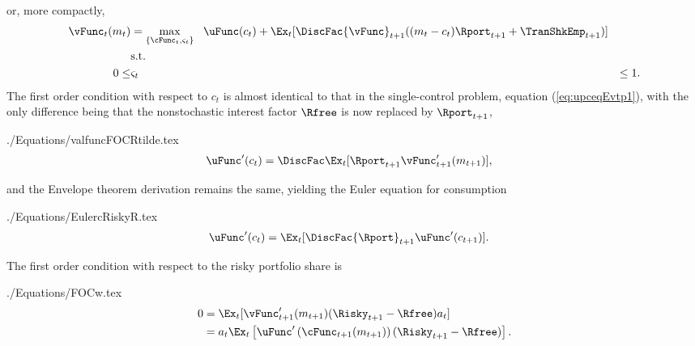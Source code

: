 \documentclass[titlepage, headings=optiontotocandhead]{\econtex}
\begin{document}

or, more compactly,
\begin{equation*}\begin{gathered}\begin{aligned}
      {\vFunc}_{t}({m}_{t})  & = \max_{\{\cFunc_{t},\varsigma_{t}\}} ~~  \uFunc({c}_{t}) +  \Ex_{t}[\DiscFac {\vFunc}_{t+1}(({m}_{t}-{c}_{t}){\Rport}_{t+1} +        {\TranShkEmp}_{t+1})]
      \\                       & \text{s.t.} & \nonumber
      \\ 0 \leq & \varsigma_{t} & \leq 1
      .
    \end{aligned}\end{gathered}\end{equation*}
The first order condition with respect to ${c}_{t}$ is almost identical
to that in the single-control problem, equation (\ref{eq:upceqEvtp1}),
with the only difference being that the nonstochastic interest factor
$\Rfree$ is now replaced by ${\Rport}_{t+1}$,
\begin{verbatimwrite}{./Equations/valfuncFOCRtilde.tex}
  \begin{equation}\begin{gathered}\begin{aligned}
        \uFunc^{\prime}({c}_{t})  & = \DiscFac \Ex_{t} [{\Rport}_{t+1} \vFunc^{\prime}_{t+1}({m}_{t+1})] \label{eq:valfuncFOCRtilde},
      \end{aligned}\end{gathered}\end{equation}
\end{verbatimwrite}

and the Envelope theorem derivation remains the same, 
yielding the Euler equation for consumption
\begin{verbatimwrite}{./Equations/EulercRiskyR.tex}
  \begin{equation}\begin{gathered}\begin{aligned}
        \uFunc^{\prime}({c}_{t})  & = \Ex_{t}[\DiscFac {\Rport}_{t+1} \uFunc^{\prime}({c}_{t+1})]. \label{eq:EulercRiskyR}
      \end{aligned}\end{gathered}\end{equation}
\end{verbatimwrite}
\unskip

The first order condition with respect to the risky portfolio share is
\begin{verbatimwrite}{./Equations/FOCw.tex}
  \begin{equation}\begin{gathered}\begin{aligned}
        0  & = \Ex_{t}[{\vFunc}_{t+1}^{\prime}({m}_{t+1})(\Risky_{t+1}-\Rfree){a}_{t}] \notag
        \\         & = {a}_{t}\Ex_{t}\left[\uFunc^{\prime}\left(\cFunc_{t+1}({m}_{t+1})\right)(\Risky_{t+1}-\Rfree)\right] \label{eq:FOCw}.
      \end{aligned}\end{gathered}\end{equation}
\end{verbatimwrite}
\unskip
\end{document}
